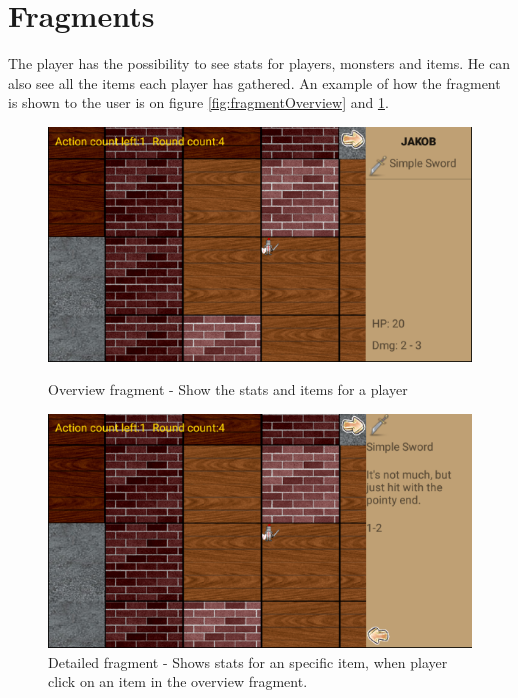 \section{Fragments}

The player has the possibility to see stats for players, monsters and items.
He can also see all the items each player has gathered. An example of how the fragment is shown to the user is on figure \ref{fig:fragmentOverview} and \ref{fig:fragmentDetailed}.


\begin{figure}[ht!]
	\centering
	\begin{minipage}[t]{0.48\textwidth}
		\includegraphics[width=\textwidth]{images/fragmentOverview.png}
		\caption{Overview fragment - Show the stats and items for a player}
		\label{fig:fragmentOverview}
	\end{minipage}
	\hfill
	\begin{minipage}[t]{0.48\textwidth}
		\includegraphics[width=\textwidth]{images/fragmentDetailed.png}
		\caption{Detailed fragment -  Shows stats for an specific item, when player click on an item in the overview fragment.}
		\label{fig:fragmentDetailed}
	\end{minipage}
\end{figure}

